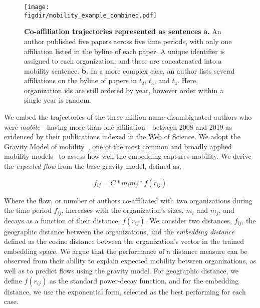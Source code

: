 \documentclass[12pt]{article} %
\def\figdir{../Figs}
\begin{document}
%
%
\begin{figure}[ht!]
    \centering
    \texttt{[image: \\figdir/mobility\_example\_combined.pdf]}
    \caption{
        \textbf{Co-affiliation trajectories represented as sentences}
        \textbf{a.} 
        An author published five papers across five time periods, with only one affiliation listed in the byline of each paper. 
        A unique identifier is assigned to each organization, and these are concatenated into a mobility sentence. 
        \textbf{b.}
        In a more complex case, an author lists several affiliations on the byline of papers in $t_{2}$, $t_{3}$, and $t_{4}$. Here, organization ids are still ordered by year, however order within a single year is random.      
    }
    \label{fig:methods:mobility_sentence}
\end{figure}


We embed the trajectories of the three million name-disambiguated authors who were \textit{mobile}---having more than one affiliation---between 2008 and 2019 as evidenced by their publications indexed in the Web of Science. 
We adopt the Gravity Model of mobility~\autocite{zipf1946gravity}, one of the most common and broadly applied mobility models~\autocite{curiel2018citygravity, lewer2008immigrationgravity, jung2008highwaygravity, hong2016busgravity, truscott2012epidemicgravity, xia2005measlesgravity} to assess how well the embedding captures mobility. 
We derive the \textit{expected flow} from the base gravity model, defined as,

\begin{equation}
	\label{eq:gravity_basic}
	f_{ij} = C*m_{i}m_{j}*f(r_{ij})
\end{equation}

Where the flow, or number of authors co-affiliated with two organizations during the time period $f_{ij}$, increases with the organization's sizes, $m_{i}$ and $m_{j}$, and decays as a function of their distance, $f(r_{ij})$. 
We consider two distances, $f_{ij}$, the geographic distance between the organizations, and the \textit{embedding distance} defined as the cosine distance between the organization's vector in the trained embedding space. 
We argue that the performance of a distance measure can be observed from their ability to explain expected mobility between organizations, as well as to predict flows using the gravity model. 
For geographic distance, we define $f(r_{ij})$ as the standard power-decay function, and for the embedding distance, we use the exponential form, selected as the best performing for each case. 
\end{document}
